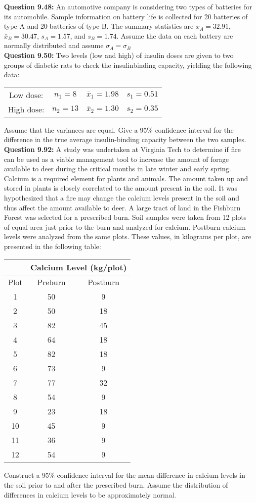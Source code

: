 \documentclass{article}
\begin{document}
\textbf{Question 9.48:}
An automotive company is considering two
types of batteries for its automobile. Sample information 
on battery life is collected for 20 batteries of
type A and 20 batteries of type B. The summary
statistics are $\bar{x}_A = 32.91$, $\bar{x}_B = 30.47$, $s_A = 1.57$,
and $s_B = 1.74$. Assume the data on each battery are
normally distributed and assume $\sigma_A = \sigma_B$\\\newline
\textbf{Question 9.50:}
Two levels (low and high) of insulin doses are
given to two groups of diabetic rats to check the 
insulinbinding capacity, yielding the following data:
\begin{center}
\begin{tabular}{c c c c}
    Low dose: & $n_1 = 8$ & $\bar{x}_1 = 1.98$ & $s_1 = 0.51$ \\
    High dose: & $n_2 = 13$ & $\bar{x}_2 = 1.30$ & $s_2 = 0.35$
\end{tabular}
\end{center}
Assume that the variances are equal. Give a 95\% 
confidence interval for the difference in the true average
insulin-binding capacity between the two samples.\\\newline
\textbf{Question 9.92:}
A study was undertaken at Virginia Tech to determine if 
fire can be used as a viable management tool to increase 
the amount of forage available to deer during the critical 
months in late winter and early spring. Calcium is a 
required element for plants and animals. The amount taken 
up and stored in plants is closely correlated to the amount 
present in the soil. It was hypothesized that a fire may 
change the calcium levels present in the soil and thus 
affect the amount available to deer. A large tract of land 
in the Fishburn Forest was selected for a prescribed burn. 
Soil samples were taken from 12 plots of equal area just 
prior to the burn and analyzed for calcium. Postburn 
calcium levels were analyzed from the same plots. These 
values, in kilograms per plot, are presented in the 
following table:
\begin{center}
\begin{tabular}{c c c}
    & \multicolumn{2}{c}{Calcium Level (kg/plot)}\\
    \hline
    Plot & Preburn & Postburn \\
    \hline
    1  & 50 & 9  \\
    2  & 50 & 18 \\
    3  & 82 & 45 \\
    4  & 64 & 18 \\
    5  & 82 & 18 \\
    6  & 73 & 9  \\
    7  & 77 & 32 \\
    8  & 54 & 9  \\
    9  & 23 & 18 \\
    10 & 45 & 9  \\
    11 & 36 & 9  \\
    12 & 54 & 9  \\
\end{tabular}
\end{center}
Construct a 95\% confidence interval for the mean 
difference in calcium levels in the soil prior to and 
after the prescribed burn. Assume the distribution of 
differences in calcium levels to be approximately normal.
\\\newline
\end{document}
